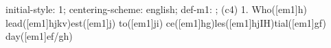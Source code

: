 initial-style: 1;
centering-scheme: english;
def-m1: \grealign;
(c4) 1. Who([em1]h) lead([em1]hjkv)est([em1]j) to([em1]ji) ce([em1]hg)les([em1]hjIH)tial([em1]gf) day([em1]ef/gh)